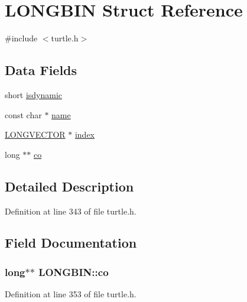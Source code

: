 \hypertarget{struct_l_o_n_g_b_i_n}{\section{L\-O\-N\-G\-B\-I\-N Struct Reference}
\label{struct_l_o_n_g_b_i_n}
}


{\ttfamily \#include $<$turtle.\-h$>$}

\subsection*{Data Fields}
\begin{DoxyCompactItemize}
\item 
short \hyperlink{struct_l_o_n_g_b_i_n_aff95fcc6c60230a52c73027909b35be7}{isdynamic}
\item 
const char $\ast$ \hyperlink{struct_l_o_n_g_b_i_n_a1b0aaff196befa968da5362cc00e5ca1}{name}
\item 
\hyperlink{struct_l_o_n_g_v_e_c_t_o_r}{L\-O\-N\-G\-V\-E\-C\-T\-O\-R} $\ast$ \hyperlink{struct_l_o_n_g_b_i_n_a9530c720bca43d9e00d52cbe306a43cc}{index}
\item 
long $\ast$$\ast$ \hyperlink{struct_l_o_n_g_b_i_n_a6f5f9fe4924c32a44baae72d02e0b014}{co}
\end{DoxyCompactItemize}


\subsection{Detailed Description}


Definition at line 343 of file turtle.\-h.



\subsection{Field Documentation}
\hypertarget{struct_l_o_n_g_b_i_n_a6f5f9fe4924c32a44baae72d02e0b014}{
\subsubsection[{co}]{\setlength{\rightskip}{0pt plus 5cm}long$\ast$$\ast$ L\-O\-N\-G\-B\-I\-N\-::co}}\label{struct_l_o_n_g_b_i_n_a6f5f9fe4924c32a44baae72d02e0b014}


Definition at line 353 of file turtle.\-h.



